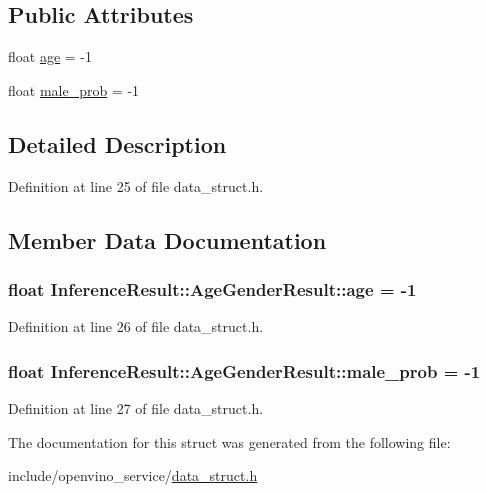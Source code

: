 \subsection*{Public Attributes}
\begin{DoxyCompactItemize}
\item 
float \hyperlink{structInferenceResult_1_1AgeGenderResult_a6c4ec413eb257cea2c02cc53a1cfc272}{age} = -\/1
\item 
float \hyperlink{structInferenceResult_1_1AgeGenderResult_a8a17d89e0d1b8bde9eb9d862486493c9}{male\+\_\+prob} = -\/1
\end{DoxyCompactItemize}


\subsection{Detailed Description}


Definition at line 25 of file data\+\_\+struct.\+h.



\subsection{Member Data Documentation}
\subsubsection[{\texorpdfstring{age}{age}}]{\setlength{\rightskip}{0pt plus 5cm}float Inference\+Result\+::\+Age\+Gender\+Result\+::age = -\/1}\hypertarget{structInferenceResult_1_1AgeGenderResult_a6c4ec413eb257cea2c02cc53a1cfc272}{}\label{structInferenceResult_1_1AgeGenderResult_a6c4ec413eb257cea2c02cc53a1cfc272}


Definition at line 26 of file data\+\_\+struct.\+h.

\subsubsection[{\texorpdfstring{male\+\_\+prob}{male_prob}}]{\setlength{\rightskip}{0pt plus 5cm}float Inference\+Result\+::\+Age\+Gender\+Result\+::male\+\_\+prob = -\/1}\hypertarget{structInferenceResult_1_1AgeGenderResult_a8a17d89e0d1b8bde9eb9d862486493c9}{}\label{structInferenceResult_1_1AgeGenderResult_a8a17d89e0d1b8bde9eb9d862486493c9}


Definition at line 27 of file data\+\_\+struct.\+h.



The documentation for this struct was generated from the following file\+:\begin{DoxyCompactItemize}
\item 
include/openvino\+\_\+service/\hyperlink{data__struct_8h}{data\+\_\+struct.\+h}\end{DoxyCompactItemize}

